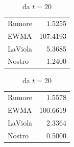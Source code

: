 \begin{table}
    \caption{Posizione: Errore quadrato medio}
    \label{tab:peqm}
    \centering
    \begin{subtable}{.49\textwidth}
        \caption{da $t=0$}
        \centering
        \begin{tabular}{l r}
            Rumore &    1.5255 \\
            EWMA &    107.4193 \\
            LaViola &   5.3685 \\
            Nostro &    1.2400 \\
        \end{tabular}
    \end{subtable}
    \hfill
    \begin{subtable}{.49\textwidth}
        \caption{ da $t=20$ }
        \label{tab:peqmb}
        \centering
        \begin{tabular}{l r}
            Rumore &   1.5578 \\
            EWMA &   100.6619 \\
            LaViola &  2.3364 \\
            Nostro &   0.5000 \\
        \end{tabular}
    \end{subtable}
\end{table}

